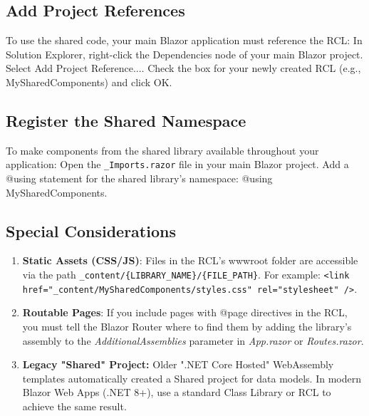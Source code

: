 \documentclass[12pt]{report}
\begin{document}
\begin{flushleft}
\subsection{Add Project References}
To use the shared code, your main Blazor application must reference the RCL:
\newline
In Solution Explorer, right-click the Dependencies node of your main Blazor project.
\newline
Select Add Project Reference....
\newline
Check the box for your newly created RCL (e.g., MySharedComponents) and click OK. 
\subsection{Register the Shared Namespace}
To make components from the shared library available throughout your application:
\newline
Open the \verb|_Imports.razor| file in your main Blazor project.
\newline
Add a @using statement for the shared library's namespace:
\newline
@using MySharedComponents. 
\subsection{Special Considerations}
\begin{enumerate}
\item
\textbf{Static Assets (CSS/JS)}: Files in the RCL's wwwroot folder are accessible via the path \verb|_content/{LIBRARY_NAME}/{FILE_PATH}|. For example: \verb|<link href="_content/MySharedComponents/styles.css" rel="stylesheet" />|.
\item
\textbf{Routable Pages}: If you include pages with @page directives in the RCL, you must tell the Blazor Router where to find them by adding the library's assembly to the \emph{AdditionalAssemblies} parameter in \emph{App.razor} or \emph{Routes.razor}.
\item
\textbf{Legacy "Shared" Project:} Older ".NET Core Hosted" WebAssembly templates automatically created a Shared project for data models. In modern Blazor Web Apps (.NET 8+), use a standard Class Library or RCL to achieve the same result.
\end{enumerate}

\end{flushleft}
\end{document}
